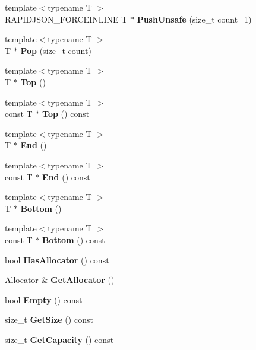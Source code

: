 \begin{DoxyCompactItemize}
{\footnotesize template$<$typename T $>$ }\\R\+A\+P\+I\+D\+J\+S\+O\+N\+\_\+\+F\+O\+R\+C\+E\+I\+N\+L\+I\+NE T $\ast$ {\bfseries Push\+Unsafe} (size\+\_\+t count=1)
\item 
\mbox{\label{a02288_a8545a8ccba595ac6e4ade9784474aa1c}} 
{\footnotesize template$<$typename T $>$ }\\T $\ast$ {\bfseries Pop} (size\+\_\+t count)
\item 
\mbox{\label{a02288_ab3ed5b4afed3c73c516678516d5e195b}} 
{\footnotesize template$<$typename T $>$ }\\T $\ast$ {\bfseries Top} ()
\item 
\mbox{\label{a02288_abd8941a6b827a7ea359cb59b79d7a886}} 
{\footnotesize template$<$typename T $>$ }\\const T $\ast$ {\bfseries Top} () const
\item 
\mbox{\label{a02288_a54987ae8ad774dd3ee80a43d268ef080}} 
{\footnotesize template$<$typename T $>$ }\\T $\ast$ {\bfseries End} ()
\item 
\mbox{\label{a02288_a605246623b39f9d36d3d12eee25f9d82}} 
{\footnotesize template$<$typename T $>$ }\\const T $\ast$ {\bfseries End} () const
\item 
\mbox{\label{a02288_a10aa1bc716b82cb0a40b3a3b9d5efe87}} 
{\footnotesize template$<$typename T $>$ }\\T $\ast$ {\bfseries Bottom} ()
\item 
\mbox{\label{a02288_af5c55983c553c7355ff6d24beb48c722}} 
{\footnotesize template$<$typename T $>$ }\\const T $\ast$ {\bfseries Bottom} () const
\item 
\mbox{\label{a02288_a657ae4d477b25d4e0045aee0efd809c3}} 
bool {\bfseries Has\+Allocator} () const
\item 
\mbox{\label{a02288_ab01f693833dfe136f574d66547623cfa}} 
Allocator \& {\bfseries Get\+Allocator} ()
\item 
\mbox{\label{a02288_a2b8bda380e33838a99e3c73ff9785f03}} 
bool {\bfseries Empty} () const
\item 
\mbox{\label{a02288_ac484468a2791bd3e9ba609bd1600ab48}} 
size\+\_\+t {\bfseries Get\+Size} () const
\item 
\mbox{\label{a02288_a67d5d7ee9424d3dd46cf9d001b6cdc6b}} 
size\+\_\+t {\bfseries Get\+Capacity} () const
\end{DoxyCompactItemize}


